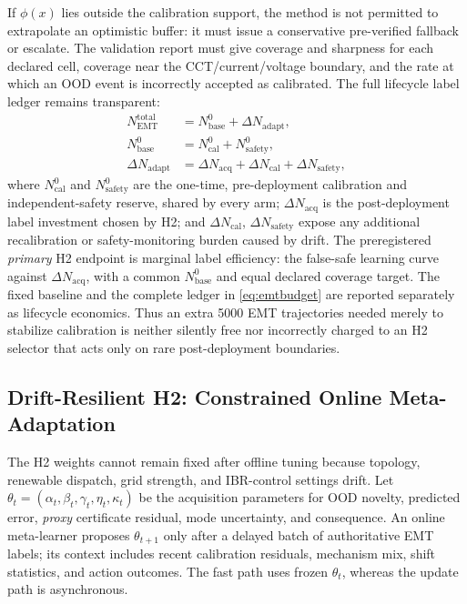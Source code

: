 \documentclass[conference]{IEEEtran}
\begin{document}
If $\phi(x)$ lies outside the calibration support, the method is not permitted to extrapolate an optimistic buffer: it must issue a conservative pre-verified fallback or escalate. The validation report must give coverage and sharpness for each declared cell, coverage near the CCT/current/voltage boundary, and the rate at which an OOD event is incorrectly accepted as calibrated. The full lifecycle label ledger remains transparent:
\begin{equation}
\begin{aligned}
N_{\mathrm{EMT}}^{\mathrm{total}}&=N_{\mathrm{base}}^{0}+\Delta N_{\mathrm{adapt}},\\
N_{\mathrm{base}}^{0}&=N_{\mathrm{cal}}^{0}+N_{\mathrm{safety}}^{0},\\
\Delta N_{\mathrm{adapt}}&=\Delta N_{\mathrm{acq}}+\Delta N_{\mathrm{cal}}+\Delta N_{\mathrm{safety}},
\end{aligned}
\label{eq:emtbudget}
\end{equation}
where $N_{\mathrm{cal}}^{0}$ and $N_{\mathrm{safety}}^{0}$ are the one-time, pre-deployment calibration and independent-safety reserve, shared by every arm; $\Delta N_{\mathrm{acq}}$ is the post-deployment label investment chosen by H2; and $\Delta N_{\mathrm{cal}}$, $\Delta N_{\mathrm{safety}}$ expose any additional recalibration or safety-monitoring burden caused by drift. The preregistered \emph{primary} H2 endpoint is marginal label efficiency: the false-safe learning curve against $\Delta N_{\mathrm{acq}}$, with a common $N_{\mathrm{base}}^{0}$ and equal declared coverage target. The fixed baseline and the complete ledger in \eqref{eq:emtbudget} are reported separately as lifecycle economics. Thus an extra 5000 EMT trajectories needed merely to stabilize calibration is neither silently free nor incorrectly charged to an H2 selector that acts only on rare post-deployment boundaries.

\subsection{Drift-Resilient H2: Constrained Online Meta-Adaptation}

The H2 weights cannot remain fixed after offline tuning because topology, renewable dispatch, grid strength, and IBR-control settings drift. Let $\theta_t=(\alpha_t,\beta_t,\gamma_t,\eta_t,\kappa_t)$ be the acquisition parameters for OOD novelty, predicted error, \emph{proxy} certificate residual, mode uncertainty, and consequence. An online meta-learner proposes $\theta_{t+1}$ only after a delayed batch of authoritative EMT labels; its context includes recent calibration residuals, mechanism mix, shift statistics, and action outcomes. The fast path uses frozen $\theta_t$, whereas the update path is asynchronous.
\end{document}
